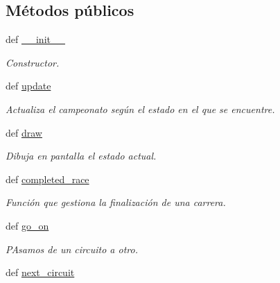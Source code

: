 \subsection*{\-Métodos públicos}
\begin{DoxyCompactItemize}
\item 
def \hyperlink{classengine_1_1modes_1_1ChampionShip_abe9670eca380df244a484e18a9b9051c}{\-\_\-\-\_\-init\-\_\-\-\_\-}
\begin{DoxyCompactList}\small\item\em \-Constructor. \end{DoxyCompactList}\item 
\hypertarget{classengine_1_1modes_1_1ChampionShip_adbf857a2cf894ce87ae61918cbfb4594}{
def \hyperlink{classengine_1_1modes_1_1ChampionShip_adbf857a2cf894ce87ae61918cbfb4594}{update}}
\label{classengine_1_1modes_1_1ChampionShip_adbf857a2cf894ce87ae61918cbfb4594}

\begin{DoxyCompactList}\small\item\em \-Actualiza el campeonato según el estado en el que se encuentre. \end{DoxyCompactList}\item 
def \hyperlink{classengine_1_1modes_1_1ChampionShip_ae1ce7fadaa086c9adc2371c9f3169cb0}{draw}
\begin{DoxyCompactList}\small\item\em \-Dibuja en pantalla el estado actual. \end{DoxyCompactList}\item 
def \hyperlink{classengine_1_1modes_1_1ChampionShip_a46b0018d96c74ea180e4403273560505}{completed\-\_\-race}
\begin{DoxyCompactList}\small\item\em \-Función que gestiona la finalización de una carrera. \end{DoxyCompactList}\item 
\hypertarget{classengine_1_1modes_1_1ChampionShip_ac219dc8f36af2655df1d59c5b5032883}{
def \hyperlink{classengine_1_1modes_1_1ChampionShip_ac219dc8f36af2655df1d59c5b5032883}{go\-\_\-on}}
\label{classengine_1_1modes_1_1ChampionShip_ac219dc8f36af2655df1d59c5b5032883}

\begin{DoxyCompactList}\small\item\em \-P\-Asamos de un circuito a otro. \end{DoxyCompactList}\item 
\hypertarget{classengine_1_1modes_1_1ChampionShip_a276f1e48510f76d6ed69c71e4de3e058}{
def \hyperlink{classengine_1_1modes_1_1ChampionShip_a276f1e48510f76d6ed69c71e4de3e058}{next\-\_\-circuit}}
\label{classengine_1_1modes_1_1ChampionShip_a276f1e48510f76d6ed69c71e4de3e058}


\end{DoxyCompactItemize}
